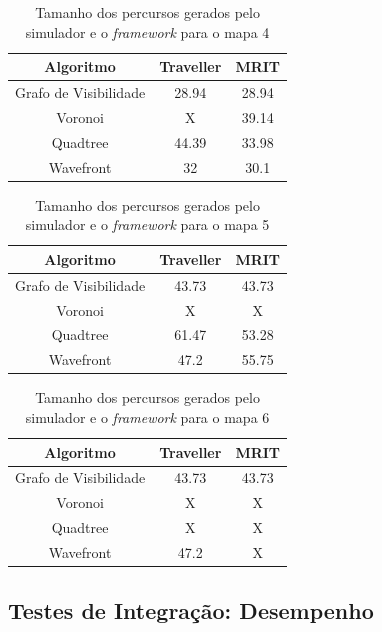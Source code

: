 \begin{table}[H]
	\centering
	\label{tab04}
	\caption{Tamanho dos percursos gerados pelo simulador e o \textit{framework} para o mapa 4}
	\begin{tabular}{ccc}
		\toprule
		\textbf{Algoritmo} & \textbf{Traveller} & \textbf{MRIT} \\
		\midrule
Grafo de Visibilidade & 28.94   & 28.94 \\
Voronoi 				  & X       & 39.14 \\
Quadtree				  & 44.39   & 33.98 \\
Wavefront             & 32      & 30.1  \\
		\bottomrule
	\end{tabular}
\end{table}

\begin{table}[H]
	\centering
	\label{tab05}
	\caption{Tamanho dos percursos gerados pelo simulador e o \textit{framework} para o mapa 5}
	\begin{tabular}{ccc}
		\toprule
		\textbf{Algoritmo} & \textbf{Traveller} & \textbf{MRIT} \\
		\midrule
Grafo de Visibilidade & 43.73   & 43.73 \\
Voronoi 				  & X      & X \\
Quadtree				  & 61.47   & 53.28 \\
Wavefront             & 47.2    & 55.75  \\
		\bottomrule
	\end{tabular}
\end{table}

\begin{table}[H]
	\centering
	\label{tab06}
	\caption{Tamanho dos percursos gerados pelo simulador e o \textit{framework} para o mapa 6}
	\begin{tabular}{ccc}
		\toprule
		\textbf{Algoritmo} & \textbf{Traveller} & \textbf{MRIT} \\
		\midrule
Grafo de Visibilidade & 43.73   & 43.73 \\
Voronoi 				  & X      & X \\
Quadtree				  & X      & X \\
Wavefront             & 47.2    & X  \\
		\bottomrule
	\end{tabular}
\end{table}

\subsection{Testes de Integração: Desempenho}

